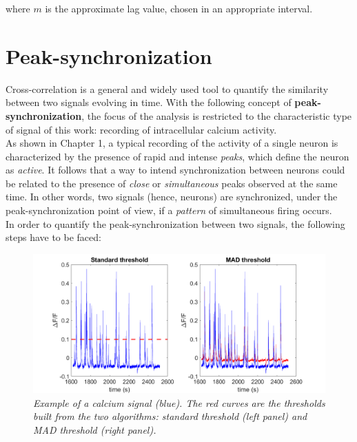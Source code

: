 \documentclass[12pt, a4paper]{report}
\begin{document}
where $m$ is the approximate lag value, chosen in an appropriate interval.



\section{Peak-synchronization} \label{section 2.3}

Cross-correlation is a general and widely used tool to quantify the similarity between two signals evolving in time. With the following concept of \textbf{peak-synchronization}, the focus of the analysis is restricted to the characteristic type of signal of this work: recording of intracellular calcium activity.\\
As shown in Chapter 1, a typical recording of the activity of a single neuron is characterized by the presence of rapid and intense \textit{peaks}, which define the neuron as \textit{active}. It follows that a way to intend synchronization between neurons could be related to the presence of \textit{close} or \textit{simultaneous} peaks observed at the same time. In other words, two signals (hence, neurons) are synchronized, under the peak-synchronization point of view, if a \textit{pattern} of simultaneous firing occurs. 
\\

In order to quantify the peak-synchronization between two signals, the following steps have to be faced:

\begin{figure}[H]
	\begin{center}
		\hspace*{-0.7 cm}
		\includegraphics[scale=.45]{thresholds.png} 
	\end{center} 
	\caption{\textit{Example of a calcium signal (blue). The red curves are the thresholds built from the two algorithms: standard threshold (left panel) and MAD threshold (right panel).}} \label{threshold}
	
\end{figure}
\end{document}
